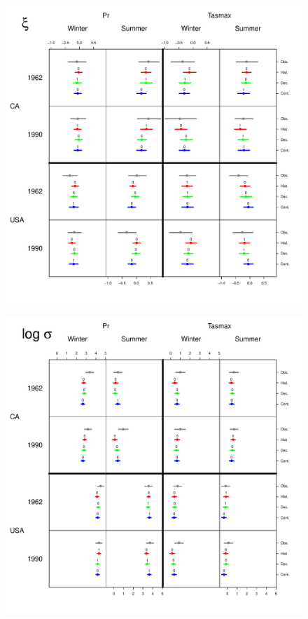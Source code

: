 \documentclass[12pt]{article}
\begin{document}
\begin{figure}
\begin{center}
\includegraphics[scale=0.5]{figs/shape.pdf}
\end{center}
\end{figure}

\begin{figure}
\begin{center}
\includegraphics[scale=0.5]{figs/log_sigma.pdf}
\end{center}
\end{figure}
\end{document}
